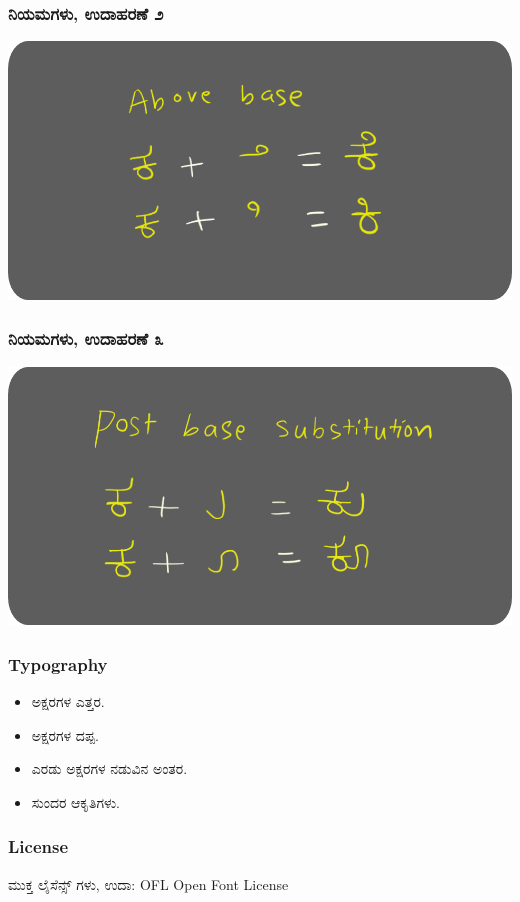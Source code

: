 \documentclass[16pt]{beamer}
\newcommand\en[1]{{\english #1}}
\begin{document}
\begin{spacing}{1.6}
  \begin{frame}
    \frametitle{ನಿಯಮಗಳು, ಉದಾಹರಣೆ ೨}
    \includegraphics[width=\textwidth]{images/abvs-bg.png}
  \end{frame}

  \begin{frame}
    \frametitle{ನಿಯಮಗಳು, ಉದಾಹರಣೆ ೩}
    \includegraphics[width=\textwidth]{images/psts-bg.png}
  \end{frame}

  \begin{frame}
    \frametitle{\en{Typography}}
    \begin{itemize}
    \item ಅಕ್ಷರಗಳ ಎತ್ತರ.
    \item ಅಕ್ಷರಗಳ ದಪ್ಪ.
    \item ಎರಡು ಅಕ್ಷರಗಳ ನಡುವಿನ ಅಂತರ.
    \item ಸುಂದರ ಆಕೃತಿಗಳು.
    \end{itemize}
  \end{frame}

  \begin{frame}
    \frametitle{\en{License}}
    ಮುಕ್ತ ಲೈಸೆನ್ಸ್ ಗಳು, ಉದಾ: \en{OFL Open Font License}
  \end{frame}


\end{spacing}
\end{document}
